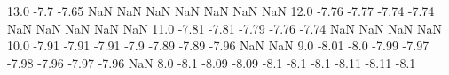 13.0  -7.7    -7.65    NaN NaN NaN NaN NaN NaN NaN
12.0  -7.76    -7.77    -7.74    -7.74    NaN NaN NaN NaN NaN
11.0  -7.81    -7.81    -7.79    -7.76    -7.74    NaN NaN NaN NaN
10.0  -7.91    -7.91    -7.91    -7.9    -7.89    -7.89    -7.96    NaN NaN
9.0  -8.01    -8.0    -7.99    -7.97    -7.98    -7.96    -7.97    -7.96    NaN
8.0  -8.1    -8.09    -8.09    -8.1    -8.1    -8.1    -8.11    -8.11    -8.1
